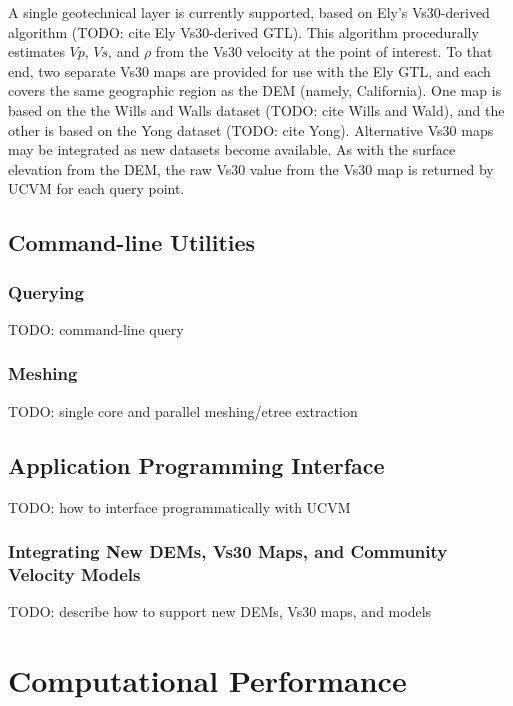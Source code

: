 A single geotechnical layer is currently supported, based on Ely's Vs30-derived algorithm (TODO: cite Ely Vs30-derived GTL). This algorithm procedurally estimates $Vp$, $Vs$, and $\rho$ from the Vs30 velocity at the point of interest. To that end, two separate Vs30 maps are provided for use with the Ely GTL, and each covers the same geographic region as the DEM (namely, California). One map is based on the the Wills and Walls dataset (TODO: cite Wills and Wald), and the other is based on the Yong dataset (TODO: cite Yong). Alternative Vs30 maps may be integrated as new datasets become available. As with the surface elevation from the DEM, the raw Vs30 value from the Vs30 map is returned by UCVM for each query point.

\subsection{Command-line Utilities}

\subsubsection{Querying}

TODO: command-line query

\subsubsection{Meshing}

TODO: single core and parallel meshing/etree extraction

\subsection{Application Programming Interface}

TODO: how to interface programmatically with UCVM

\subsubsection{Integrating New DEMs, Vs30 Maps, and Community Velocity Models}

TODO: describe how to support new DEMs, Vs30 maps, and models

\section{Computational Performance}
\label{sec:conclusions}

